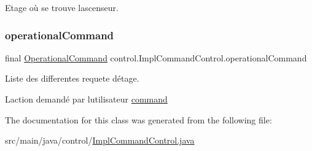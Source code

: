 Etage où se trouve l\textquotesingle{}ascenseur. 

\mbox{\label{classcontrol_1_1_impl_command_control_adbe2ee9057a11e4d2408947f5ff83cd5}} 
\subsubsection{\texorpdfstring{operationalCommand}{operationalCommand}}
{\footnotesize\ttfamily final \mbox{\hyperlink{interfacecontrol_1_1_operational_command}{Operational\+Command}} control.\+Impl\+Command\+Control.\+operational\+Command\hspace{0.3cm}{\ttfamily [private]}}



Liste des differentes requete d\textquotesingle{}étage. 

L\textquotesingle{}action demandé par l\textquotesingle{}utilisateur \mbox{\hyperlink{namespacecontrol_1_1command}{command}} 

The documentation for this class was generated from the following file\+:\begin{DoxyCompactItemize}
\item 
src/main/java/control/\mbox{\hyperlink{_impl_command_control_8java}{Impl\+Command\+Control.\+java}}\end{DoxyCompactItemize}
